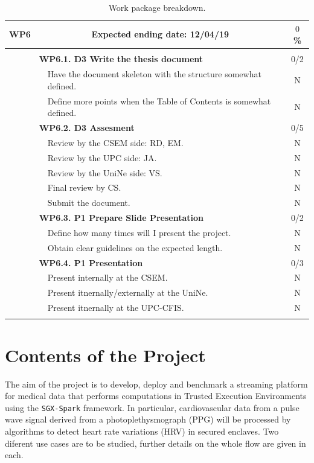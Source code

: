 \documentclass{article}
\newcommand{\lline}[1]{\hline\multicolumn{#1}{c}{}\\[-1.34em]\hline}
\begin{document}
\begin{longtable}{lm{5cm}m{7cm}c}
\textbf{WP6} & \multicolumn{2}{c}{Expected ending date: 12/04/19} & $0$ \% \\[3pt] \lline{4} %
& \multicolumn{2}{l}{\textbf{WP6.1. D3 Write the thesis document}} & 0/2 \\[3pt] \hline
& & Have the document skeleton with the structure somewhat defined. & N \\[3pt]
& & Define more points when the Table of Contents is somewhat defined. & N \\[3pt] \hline
& \multicolumn{2}{l}{\textbf{WP6.2. D3 Assesment}} & 0/5 \\[3pt] \hline
& & Review by the CSEM side: RD, EM. & N \\[3pt]
& & Review by the UPC side: JA. & N \\[3pt]
& & Review by the UniNe side: VS. & N \\[3pt]
& & Final review by CS. & N \\[3pt]
& & Submit the document. & N \\[3pt] \hline
& \multicolumn{2}{l}{\textbf{WP6.3. P1 Prepare Slide Presentation}} & 0/2 \\[3pt] \hline
& & Define how many times will I present the project. & N \\[3pt]
& & Obtain clear guidelines on the expected length. & N \\[3pt] \hline
& \multicolumn{2}{l}{\textbf{WP6.4. P1 Presentation}} & 0/3 \\[3pt] \hline
& & Present internally at the CSEM. & N \\[3pt]
& & Present itnernally/externally at the UniNe. & N \\[3pt]
& & Present itnernally at the UPC-CFIS. & N \\[3pt] \hline

\caption{Work package breakdown. \label{table:big-date-table}}
\end{longtable}

\newpage

\section{Contents of the Project}
The aim of the project is to develop, deploy and benchmark a streaming platform for medical data that performs computations in Trusted Execution Environments using the \texttt{SGX-Spark} framework. In particular, cardiovascular data from a pulse wave signal derived from a photoplethysmograph (PPG) will be processed by algorithms to detect heart rate variations (HRV) in secured enclaves. Two diferent use cases are to be studied, further details on the whole flow are given in each.
\end{document}
